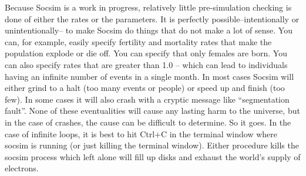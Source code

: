 Because Socsim is a work in progress, relatively little pre-simulation
checking is done of either the rates or the parameters.  It is
perfectly possible--intentionally or unintentionally-- to make Socsim
do things that do not make a lot of sense. You can, for example,
easily specify fertility and mortality rates that make the population
explode or die off. You can specify that only females are born. You
can also specify rates that are greater than 1.0 -- which can lead to
individuals having an infinite number of events in a single month.  In
most cases Socsim will either grind to a halt (too many events or
people) or speed up and finish (too few).  In some cases it will
also crash with a cryptic message like ``segmentation fault''.  None
of these eventualities will cause any lasting harm to the universe,
but in the case of crashes, the cause can be difficult to
determine. So it goes.  In the case of infinite loops, it is best to hit Ctrl+C
in the terminal window where socsim is running (or just killing the
terminal window).  Either procedure kills the socsim process which
left alone will fill up disks and exhaust the world's supply of electrons.  



